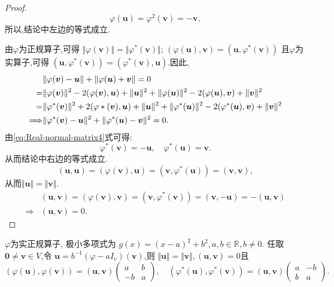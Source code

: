\begin{proof}
  \[
    \varphi(\bm{u})=\varphi^2(\bm{v})=-\bm{v},
  \]
  所以,结论中左边的等式成立.

  由$\varphi$为正规算子,可得
  $\Vert\varphi(\bm{v})\Vert=\Vert\varphi^*(\bm{v})\Vert$;
  $(\varphi(\bm{u}),\bm{v})=(\bm{u},\varphi^*(\bm{v}))$
  且$\varphi$为实算子,可得
  $(\bm{u},\varphi^*(\bm{v}))=(\varphi^*(\bm{v}),\bm{u})$.因此,
  \begin{align}
    & \Vert\varphi(\bm{v})-\bm{u}\Vert+
      \Vert\varphi(\bm{u})+\bm{v}\Vert=0\label{eq:Real-normal-matrix3}\\
    = & \Vert\varphi(\bm{v})\Vert^2-2(\varphi(\bm{v}),\bm{u})+
        \Vert\bm{u}\Vert^2+\Vert\varphi(\bm{u})\Vert^2-2(\varphi(\bm{u}),\bm{v})+
        \Vert\bm{v}\Vert^2\notag\\
    = & \Vert\varphi^*(\bm{v})\Vert^2+2(\varphi*(\bm{v}),\bm{u})+
        \Vert\bm{u}\Vert^2+
        \Vert\varphi^*(\bm{u})\Vert^2-2(\varphi^*(\bm{u}),\bm{v})+
        \Vert\bm{v}\Vert^2\notag\\
    \Longrightarrow & \Vert\varphi^*(\bm{v})-\bm{u}\Vert^2+
        \Vert\varphi^*(\bm{u})-\bm{v}\Vert^2=0.\label{eq:Real-normal-matrix4}
  \end{align}
  由\eqref{eq:Real-normal-matrix4}式可得:
  \[
    \varphi^*(\bm{v})=-\bm{u}, \quad \varphi^*(\bm{u})=\bm{v}.
  \]
  从而结论中右边的等式成立.
  \[
    (\bm{u},\bm{u})=(\varphi(\bm{v}),\bm{u})=(\bm{v},\varphi^*(\bm{u}))=(\bm{v},\bm{v}),
  \]
  从而$\Vert\bm{u}\Vert=\Vert\bm{v}\Vert$.
  \begin{align*}
    & (\bm{u},\bm{v})=(\varphi(\bm{v}),\bm{v})=
      (\bm{v},\varphi^*(\bm{v}))=(\bm{v},-\bm{u})=-(\bm{u},\bm{v})\\
    \Longrightarrow & (\bm{u},\bm{v})=0.
  \end{align*}
\end{proof}

\begin{theory}\label{thr:Real-normal-matrix4}
  $\varphi$为实正规算子, 极小多项式为
  $g(x)=(x-a)^2+b^2, a,b\in\mathbb{R},b\neq 0$.
  任取$\bm{0}\neq \bm{v}\in V$,令
  $\bm{u}=b^{-1}(\varphi-aI_v)(\bm{v})$,则
  $\Vert\bm{u}\Vert=\Vert\bm{v}\Vert, (\bm{u},\bm{v})=0$且
  \[
    (\varphi(\bm{u}),\varphi(\bm{v}))=(\bm{u},\bm{v})\begin{pmatrix}
      a & b\\
      -b & a
    \end{pmatrix},\quad
    (\varphi^*(\bm{u}),\varphi^*(\bm{v}))=(\bm{u},\bm{v})\begin{pmatrix}
      a & -b\\
      b & a
    \end{pmatrix}.
  \]
\end{theory}

